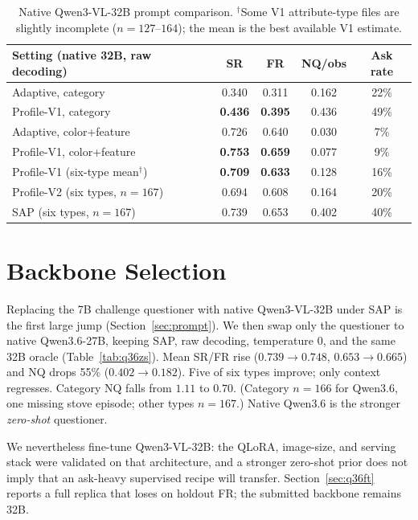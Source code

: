 \documentclass[10pt,a4paper]{article}
\begin{document}
\begin{table}[h]
\centering
\small
\begin{tabular}{lcccc}
\toprule
Setting (native 32B, raw decoding) & SR & FR & NQ/obs & Ask rate \\
\midrule
Adaptive, category & 0.340 & 0.311 & 0.162 & 22\% \\
Profile-V1, category & \textbf{0.436} & \textbf{0.395} & 0.436 & 49\% \\
Adaptive, color+feature & 0.726 & 0.640 & 0.030 & 7\% \\
Profile-V1, color+feature & \textbf{0.753} & \textbf{0.659} & 0.077 & 9\% \\
Profile-V1 (six-type mean$^\dagger$) & \textbf{0.709} & \textbf{0.633} & 0.128 & 16\% \\
Profile-V2 (six types, $n{=}167$) & 0.694 & 0.608 & 0.164 & 20\% \\
SAP (six types, $n{=}167$) & 0.739 & 0.653 & 0.402 & 40\% \\
\bottomrule
\end{tabular}
\caption{Native Qwen3-VL-32B prompt comparison. $^\dagger$Some V1
attribute-type files are slightly incomplete ($n=127$--$164$); the mean
is the best available V1 estimate.}
\label{tab:native32}
\end{table}

\section{Backbone Selection}
\label{sec:backbone}

Replacing the 7B challenge questioner with native Qwen3-VL-32B under
SAP is the first large jump (Section~\ref{sec:prompt}). We then swap
only the questioner to native Qwen3.6-27B, keeping SAP, raw decoding,
temperature 0, and the same 32B oracle (Table~\ref{tab:q36zs}). Mean
SR/FR rise ($0.739\rightarrow 0.748$, $0.653\rightarrow 0.665$) and
NQ drops 55\% ($0.402\rightarrow 0.182$). Five of six types improve;
only context regresses. Category NQ falls from $1.11$ to $0.70$.
(Category $n{=}166$ for Qwen3.6, one missing stove episode; other
types $n{=}167$.) Native Qwen3.6 is the stronger \emph{zero-shot}
questioner.

We nevertheless fine-tune Qwen3-VL-32B: the QLoRA, image-size, and
serving stack were validated on that architecture, and a stronger
zero-shot prior does not imply that an ask-heavy supervised recipe
will transfer. Section~\ref{sec:q36ft} reports a full replica that
loses on holdout FR; the submitted backbone remains 32B.
\end{document}
